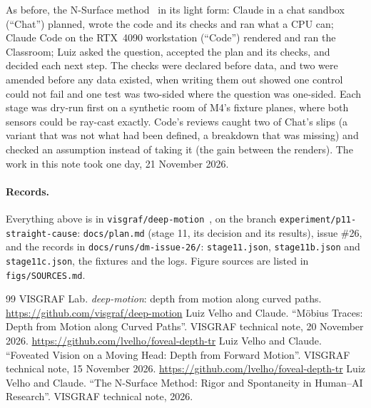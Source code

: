 \documentclass[11pt,a4paper]{article}
\newcommand{\code}[1]{\texttt{\small #1}}
\newcommand{\pth}[1]{{\small\nolinkurl{#1}}}   %
\begin{document}
As before, the N-Surface method~\cite{nsurface} in its light form: Claude in a chat sandbox (``Chat'') planned, wrote the
code and its checks and ran what a CPU can; Claude Code on the RTX~4090 workstation (``Code'') rendered and ran the
Classroom; Luiz asked the question, accepted the plan and its checks, and decided each next step. The checks were declared
before data, and two were amended before any data existed, when writing them out showed one control could not fail and
one test was two-sided where the question was one-sided. Each stage was dry-run first on a synthetic room of M4's fixture
planes, where both sensors could be ray-cast exactly. Code's reviews caught two of Chat's slips (a variant that was not
what had been defined, a breakdown that was missing) and checked an assumption instead of taking it (the gain between the
renders). The work in this note took one day, 21 November 2026.

\paragraph{Records.} Everything above is in \code{visgraf/deep-motion}~\cite{dm}, on the branch
\pth{experiment/p11-straight-cause}: \pth{docs/plan.md} (stage 11, its decision and its results), issue \#26, and the
records in \pth{docs/runs/dm-issue-26/}: \code{stage11.json}, \code{stage11b.json} and \code{stage11c.json}, the fixtures
and the logs. Figure sources are listed in \pth{figs/SOURCES.md}.

\begin{thebibliography}{99}
 VISGRAF Lab. \emph{deep-motion}: depth from motion along curved paths.
  \url{https://github.com/visgraf/deep-motion}
 Luiz Velho and Claude. ``M\"obius Traces: Depth from Motion along Curved Paths''. VISGRAF technical note,
  20 November 2026. \url{https://github.com/lvelho/foveal-depth-tr}
 Luiz Velho and Claude. ``Foveated Vision on a Moving Head: Depth from Forward Motion''. VISGRAF technical
  note, 15 November 2026. \url{https://github.com/lvelho/foveal-depth-tr}
 Luiz Velho and Claude. ``The N-Surface Method: Rigor and Spontaneity in Human--AI Research''.
  VISGRAF technical note, 2026.
\end{thebibliography}
\end{document}
